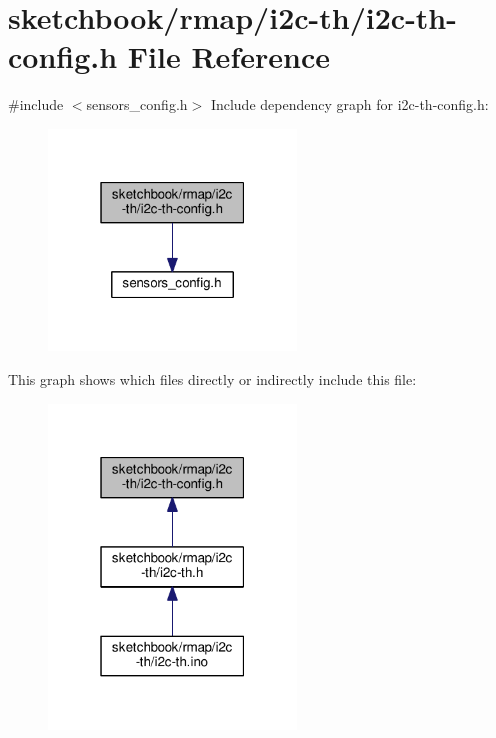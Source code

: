 \hypertarget{i2c-th-config_8h}{}\section{sketchbook/rmap/i2c-\/th/i2c-\/th-\/config.h File Reference}
\label{i2c-th-config_8h}
{\ttfamily \#include $<$sensors\+\_\+config.\+h$>$}\newline
Include dependency graph for i2c-\/th-\/config.h\+:\nopagebreak
\begin{figure}[H]
\begin{center}
\leavevmode
\includegraphics[width=187pt]{i2c-th-config_8h__incl}
\end{center}
\end{figure}
This graph shows which files directly or indirectly include this file\+:\nopagebreak
\begin{figure}[H]
\begin{center}
\leavevmode
\includegraphics[width=187pt]{i2c-th-config_8h__dep__incl}
\end{center}
\end{figure}
